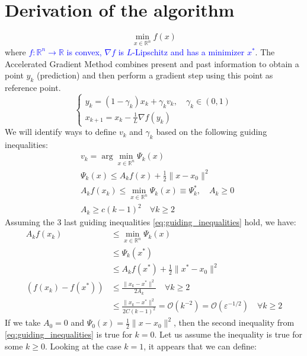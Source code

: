 \documentclass[12pt, openany]{report}
\newcommand{\R}{\mathbb{R}}
\renewcommand{\O}{\mathcal{O}}
\theoremstyle{definition}
\begin{document}
\section{Derivation of the algorithm}
\begin{equation}
	\min_{x \in \R^n} f(x) 
\end{equation}
where \textcolor{blue}{$f: \R^n \to \R$ is convex, $\nabla f$ is $L$-Lipschitz and has a minimizer $x^*$}. The Accelerated Gradient Method combines present and past information to obtain a point $y_k$ (prediction) and then perform a gradient step using this point as reference point.\\
\begin{equation}
	\begin{cases}
		y_k = (1-\gamma_k)x_k + \gamma_k v_k, \quad \gamma_k \in (0,1)\\
		x_{k+1} = x_k - \frac{1}{L} \nabla f(y_k)
	\end{cases}
\end{equation}
We will identify ways to define $v_k$ and $\gamma_k$ based on the following guiding inequalities:
\begin{equation}\label{eq:guiding_inequalities}
	\begin{aligned}
		&v_k = \arg \min_{x \in \R^n} \Psi_k (x)\\
		&\Psi_k (x) \leq A_k f(x) + \frac{1}{2} \|x-x_0\|^2\\
		&A_k f(x_k) \leq \min_{x \in \R^n} \Psi_k (x) \equiv \Psi_k^*, \quad A_k \geq 0\\
		&A_k \geq c(k-1)^2 \quad \forall k \geq 2
	\end{aligned}
\end{equation}
Assuming the 3 last guiding inequalities \eqref{eq:guiding_inequalities} hold, we have:
\begin{equation}
	\begin{aligned}
		A_kf(x_k) &\leq \min_{x \in \R^n} \Psi_k (x)\\
		&\leq \Psi_k(x^*)\\
		&\leq A_k f(x^*) + \frac{1}{2} \|x^*-x_0\|^2\\
		\left(f(x_k)-f(x^*)\right) &\leq \frac{\|x_k-x^*\|^2}{2 A_k} \quad \forall k \geq 2\\
		&\leq \frac{\|x_k-x^*\|^2}{2 C(k-1)^2} = \O(k^{-2}) = \O(\varepsilon^{-1/2}) \quad \forall k \geq 2
	\end{aligned}
\end{equation}
If we take $A_0=0$ and $\Psi_0(x) = \frac{1}{2} \|x-x_0\|^2$, then the second inequality from \eqref{eq:guiding_inequalities} is true for $k=0$. Let us assume the inequality is true for some $k \geq 0$. Looking at the case $k=1$, it appears that we can define:
\end{document}
